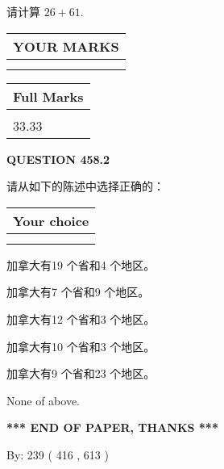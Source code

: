\documentclass{ctexart}
\begin{document}
  
 
请计算 $ %
26 +  %
61 $.
 

 

 
  
\vspace{0.2in}
  
\noindent\begin{tabular}{|l|}
\hline
 YOUR MARKS  \\
\hline
 \\ 
 \\ 
\hline
\end{tabular}
\hspace{0.05in} \begin{tabular}{|l|}
\hline
 Full Marks  \\
\hline
 \\ 
33.33 \\
\hline
\end{tabular}
{\textbf{\Large{QUESTION
458.2 
}}}
  
  
请从如下的陈述中选择正确的：
  
  
\noindent\hspace{3.0in} \begin{tabular}{|l|}
\hline
Your choice \\
\hline
 \\ 
 \\ 
\hline
\end{tabular}
  
  
 
 
加拿大有19 个省和4 个地区。
 
 
加拿大有7 个省和9 个地区。
 
 
加拿大有12 个省和3 个地区。
 
 
加拿大有10 个省和3 个地区。
 
 
加拿大有9 个省和23 个地区。
 
 
 None of above.
 
 
   
   
 \vspace{0.2in}
 
   
   
   
   
\vspace{1.0in} 
{\textbf{\large{ *** END OF PAPER, THANKS *** }}} 
   
   
\hspace{1.0in} By: 
 239 ( 416 ,  613 )
   
\end{document}

